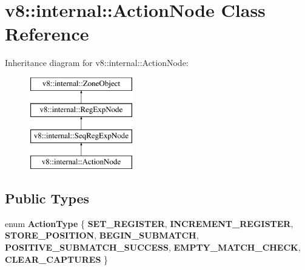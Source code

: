 \hypertarget{classv8_1_1internal_1_1ActionNode}{}\section{v8\+:\+:internal\+:\+:Action\+Node Class Reference}
\label{classv8_1_1internal_1_1ActionNode}
Inheritance diagram for v8\+:\+:internal\+:\+:Action\+Node\+:\begin{figure}[H]
\begin{center}
\leavevmode
\includegraphics[height=4.000000cm]{classv8_1_1internal_1_1ActionNode}
\end{center}
\end{figure}
\subsection*{Public Types}
\begin{DoxyCompactItemize}
\item 
\mbox{\label{classv8_1_1internal_1_1ActionNode_ab695380c09977f360b2d4f817f9124bc}} 
enum {\bfseries Action\+Type} \{ \newline
{\bfseries S\+E\+T\+\_\+\+R\+E\+G\+I\+S\+T\+ER}, 
{\bfseries I\+N\+C\+R\+E\+M\+E\+N\+T\+\_\+\+R\+E\+G\+I\+S\+T\+ER}, 
{\bfseries S\+T\+O\+R\+E\+\_\+\+P\+O\+S\+I\+T\+I\+ON}, 
{\bfseries B\+E\+G\+I\+N\+\_\+\+S\+U\+B\+M\+A\+T\+CH}, 
\newline
{\bfseries P\+O\+S\+I\+T\+I\+V\+E\+\_\+\+S\+U\+B\+M\+A\+T\+C\+H\+\_\+\+S\+U\+C\+C\+E\+SS}, 
{\bfseries E\+M\+P\+T\+Y\+\_\+\+M\+A\+T\+C\+H\+\_\+\+C\+H\+E\+CK}, 
{\bfseries C\+L\+E\+A\+R\+\_\+\+C\+A\+P\+T\+U\+R\+ES}
 \}
\end{DoxyCompactItemize}
